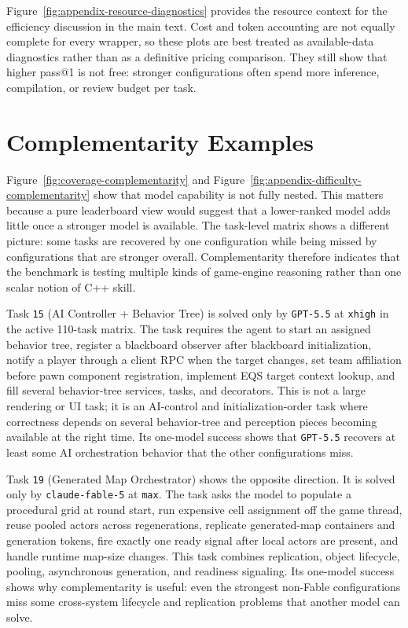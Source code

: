 \documentclass[11pt]{article}
\begin{document}
Figure~\ref{fig:appendix-resource-diagnostics} provides the resource context for the efficiency discussion in the main text. Cost and token accounting are not equally complete for every wrapper, so these plots are best treated as available-data diagnostics rather than as a definitive pricing comparison. They still show that higher pass@1 is not free: stronger configurations often spend more inference, compilation, or review budget per task.

\FloatBarrier
\section{Complementarity Examples}
\label{app:complementarity-examples}
Figure~\ref{fig:coverage-complementarity} and Figure~\ref{fig:appendix-difficulty-complementarity} show that model capability is not fully nested. This matters because a pure leaderboard view would suggest that a lower-ranked model adds little once a stronger model is available. The task-level matrix shows a different picture: some tasks are recovered by one configuration while being missed by configurations that are stronger overall. Complementarity therefore indicates that the benchmark is testing multiple kinds of game-engine reasoning rather than one scalar notion of C++ skill.

Task \texttt{15} (AI Controller + Behavior Tree) is solved only by \texttt{GPT-5.5} at \texttt{xhigh} in the active 110-task matrix. The task requires the agent to start an assigned behavior tree, register a blackboard observer after blackboard initialization, notify a player through a client RPC when the target changes, set team affiliation before pawn component registration, implement EQS target context lookup, and fill several behavior-tree services, tasks, and decorators. This is not a large rendering or UI task; it is an AI-control and initialization-order task where correctness depends on several behavior-tree and perception pieces becoming available at the right time. Its one-model success shows that \texttt{GPT-5.5} recovers at least some AI orchestration behavior that the other configurations miss.

Task \texttt{19} (Generated Map Orchestrator) shows the opposite direction. It is solved only by \texttt{claude-fable-5} at \texttt{max}. The task asks the model to populate a procedural grid at round start, run expensive cell assignment off the game thread, reuse pooled actors across regenerations, replicate generated-map containers and generation tokens, fire exactly one ready signal after local actors are present, and handle runtime map-size changes. This task combines replication, object lifecycle, pooling, asynchronous generation, and readiness signaling. Its one-model success shows why complementarity is useful: even the strongest non-Fable configurations miss some cross-system lifecycle and replication problems that another model can solve.
\end{document}
